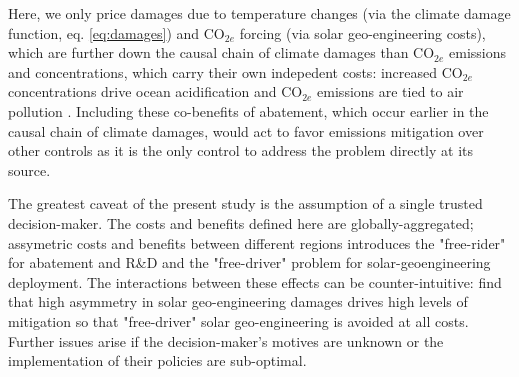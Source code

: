 \documentclass[9pt,twocolumn,twoside,lineno]{pnas-new}
\begin{document}
Here, we only price damages due to temperature changes (via the climate damage function, eq. \ref{eq:damages}) and CO$_{2e}$ forcing (via solar geo-engineering costs), which are further down the causal chain of climate damages than CO$_{2e}$ emissions and concentrations, which carry their own indepedent costs: increased CO$_{2e}$ concentrations drive ocean acidification and CO$_{2e}$ emissions are tied to air pollution \cite{silva_global_2013, burnett_global_2018}. Including these co-benefits of abatement, which occur earlier in the causal chain of climate damages, would act to favor emissions mitigation over other controls as it is the only control to address the problem directly at its source.

The greatest caveat of the present study is the assumption of a single trusted decision-maker. The costs and benefits defined here are globally-aggregated; assymetric costs and benefits between different regions introduces the "free-rider" for abatement and R\&D and the "free-driver" problem for solar-geoengineering deployment. The interactions between these effects can be counter-intuitive: \cite{moreno-cruz_mitigation_2015} find that high asymmetry in solar geo-engineering damages drives high levels of mitigation so that "free-driver" solar geo-engineering is avoided at all costs. Further issues arise if the decision-maker's motives are unknown or the implementation of their policies are sub-optimal.
\end{document}
